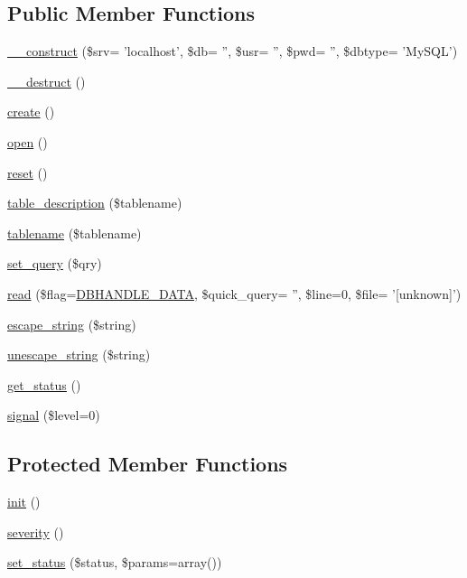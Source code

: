 \subsection*{Public Member Functions}
\begin{CompactItemize}
\item 
\hyperlink{classDbHandler_e54e9d4643f41a9296167086f6a769fc}{\_\-\_\-construct} (\$srv= 'localhost', \$db= '', \$usr= '', \$pwd= '', \$dbtype= 'MySQL')
\item 
\hyperlink{classDbHandler_7cd6bd727d1f296eb5dbfae6ca36ab3f}{\_\-\_\-destruct} ()
\item 
\hyperlink{classDbHandler_c9e93cb0ab57f03b2719eebd0c0ee2ef}{create} ()
\item 
\hyperlink{classDbHandler_fccbfc69ead84f8445116e050d1cfc2d}{open} ()
\item 
\hyperlink{classDbHandler_9982df4830f05803935bb31bac7fae3d}{reset} ()
\item 
\hyperlink{classDbHandler_f7fd704b72b00e315aafa08e47e90991}{table\_\-description} (\$tablename)
\item 
\hyperlink{classDbHandler_baca15a312800e5522b3efd9dff036f5}{tablename} (\$tablename)
\item 
\hyperlink{classDbHandler_305a3225c4760a88a06b0d55d0893962}{set\_\-query} (\$qry)
\item 
\hyperlink{classDbHandler_fb193ff3fde35c7968d2e2fe4f8546be}{read} (\$flag=\hyperlink{class_8dbhandler_8php_cc5178c2a582eafa4ef488ed3394b725}{DBHANDLE\_\-DATA}, \$quick\_\-query= '', \$line=0, \$file= '\mbox{[}unknown\mbox{]}')
\item 
\hyperlink{classDbHandler_67d77702ff6db70f89123d3f947af143}{escape\_\-string} (\$string)
\item 
\hyperlink{classDbHandler_27c604b14c39913d34630e5504979b15}{unescape\_\-string} (\$string)
\item 
\hyperlink{class__OWL_99ec771fa2c5c279f80152cc09e489a8}{get\_\-status} ()
\item 
\hyperlink{class__OWL_61c04b80fe17e2f1e339a6d6a89e45f3}{signal} (\$level=0)
\end{CompactItemize}
\subsection*{Protected Member Functions}
\begin{CompactItemize}
\item 
\hyperlink{class__OWL_e0ef3ded56e8a6b34b6461e5a721cd3e}{init} ()
\item 
\hyperlink{class__OWL_5b88d497ccf2305fa411b9bd3f4bfe6f}{severity} ()
\item 
\hyperlink{class__OWL_ea912d0ede9b3c2a69b79072d94d4787}{set\_\-status} (\$status, \$params=array())
\end{CompactItemize}
